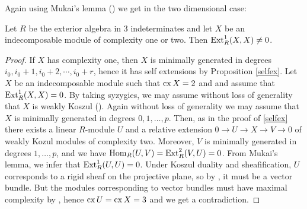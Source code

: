\documentclass[10pt]{amsart}
\begin{document}
 \noindent  Again using Mukai's lemma (\cite[1.4]{Ru}) we get in the two dimensional case:
 
\begin{prop} Let $R$ be the exterior algebra in $3$ indeterminates
and let $X$ be an indecomposable  module of complexity one or two. Then $\operatorname{Ext}\nolimits^1_R(X,X)\ne 0$.
\end{prop}
\begin{proof}  If $X$ has complexity one, then $X$ is minimally generated in degrees $i_0, i_0+1, i_0+2, \cdots, i_0+r$,
hence it has self extensions by Proposition \ref{selfex}.
Let $X$ be an indecomposable module such that $\operatorname{cx}\nolimits X = 2$ and 
and assume that $\operatorname{Ext}\nolimits^1_R(X,X)=0$. By taking syzygies, we may assume without loss of generality that $X $ is weakly Koszul (\cite{MVZ1}). Again without loss of generality we may assume that $X$ is minimally generated in degrees $0,1,\ldots,p$. Then, as in the proof of \ref{selfex} there exists a linear $R$-module $U$ and a relative extension $0\to U\to X\to V\to 0$ of weakly Kozul modules of complexity  two. Moreover, $V$ is minimally generated in degrees $1,\ldots,p$, and we have $\operatorname{Hom}_R(U,V)=\operatorname{Ext}\nolimits_R^2(V,U)=0$. From Mukai's lemma, we infer that $\operatorname{Ext}\nolimits_R^1(U,U)=0$. Under Koszul duality and sheafification, $U$ corresponds to a rigid sheaf on the projective plane, so by \cite{D}, it must be a vector bundle. But the modules corresponding to vector bundles must have maximal complexity by \cite {AAH}, hence $\operatorname{cx}\nolimits U=\operatorname{cx}\nolimits X=3$ and we get a contradiction.
\end{proof} 
 
\end{document}
